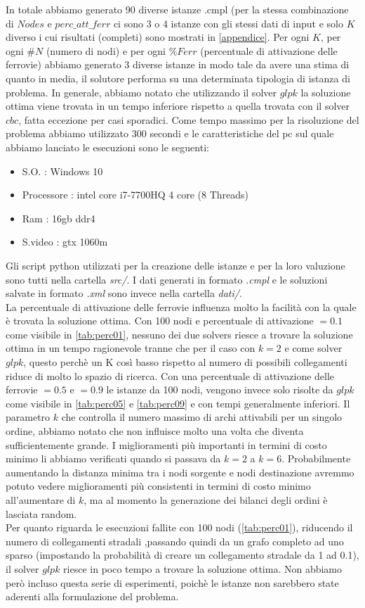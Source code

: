 \documentclass{article}
\begin{document}
In totale abbiamo generato 90 diverse istanze .cmpl (per la stessa combinazione di $Nodes$ e $perc\_att\_ferr$ ci sono 3 o 4 istanze con gli stessi dati di input e solo $K$ diverso i cui risultati (completi) sono mostrati in \cref{appendice}.
Per ogni $K$, per ogni $\#N$ (numero di nodi) e per ogni $\%Ferr$ (percentuale di attivazione delle ferrovie) abbiamo generato 3 diverse istanze in modo tale da avere una stima di quanto in media, il solutore performa su una determinata tipologia di istanza di problema. 
In generale, abbiamo notato che utilizzando il solver $glpk$ la soluzione ottima viene trovata in un tempo inferiore rispetto a quella trovata con il solver $cbc$, fatta eccezione per casi sporadici. Come tempo massimo per la risoluzione del problema abbiamo utilizzato 300 secondi e le caratteristiche del pc sul quale abbiamo lanciato le esecuzioni sono le seguenti:
\begin{itemize}
    \item S.O. : Windows 10
    \item Processore : intel core i7-7700HQ 4 core (8 Threads)
    \item Ram : 16gb ddr4
    \item S.video : gtx 1060m
\end{itemize}
Gli script python utilizzati per la creazione delle istanze e per la loro valuzione sono tutti nella cartella \emph{src/}. I dati generati in formato \emph{.cmpl} e le soluzioni salvate in formato \emph{.xml} sono invece nella cartella \emph{dati/}.
\\
La percentuale di attivazione delle ferrovie influenza molto la facilità con la quale è trovata la soluzione ottima. Con 100 nodi e percentuale di attivazione $= 0.1$ come visibile in \cref{tab:perc01}, nessuno dei due solvers riesce a trovare la soluzione ottima in un tempo ragionevole tranne che per il caso con $k = 2$ e come solver $glpk$, questo perchè un K così basso rispetto al numero di possibili collegamenti riduce di molto lo spazio di ricerca. Con una percentuale di attivazione delle ferrovie $= 0.5$ e $=0.9$ le istanze da 100 nodi, vengono invece solo risolte da $glpk$ come visibile in \cref{tab:perc05} e \cref{tab:perc09} e con tempi generalmente inferiori.
Il parametro $k$ che controlla il numero massimo di archi attivabili per un singolo ordine, abbiamo notato che non influisce molto una volta che diventa sufficientemente grande. I miglioramenti più importanti in termini di costo minimo li abbiamo verificati quando si passava da $k = 2$ a $k = 6$. Probabilmente aumentando la distanza minima tra i nodi sorgente e nodi destinazione avremmo potuto vedere miglioramenti più consistenti in termini di costo minimo all'aumentare di $k$, ma al momento la generazione dei bilanci degli ordini è lasciata random.
\\
Per quanto riguarda le esecuzioni fallite con 100 nodi (\cref{tab:perc01}), riducendo il numero di collegamenti stradali ,passando quindi da un grafo completo ad uno sparso (impostando la probabilità di creare un collegamento stradale da 1 ad 0.1), il solver $glpk$ riesce in poco tempo a trovare la soluzione ottima. Non abbiamo però incluso questa serie di esperimenti, poichè le istanze non sarebbero state aderenti alla formulazione del problema.
\end{document}

